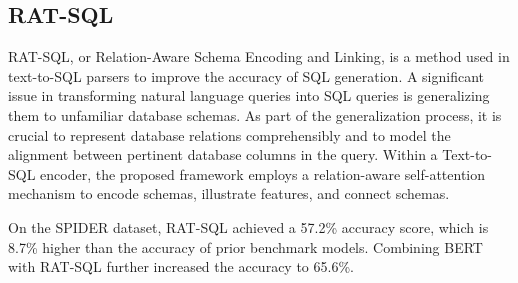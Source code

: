 \subsection{RAT-SQL} \label{sec:ratsql}

RAT-SQL, or Relation-Aware Schema Encoding and Linking\cite{wang_rat_sql_2021}, is a method used in text-to-SQL parsers to improve the accuracy of SQL generation. A significant issue in transforming natural language queries into SQL queries is generalizing them to unfamiliar database schemas. As part of the generalization process, it is crucial to represent database relations comprehensibly and to model the alignment between pertinent database columns in the query. Within a Text-to-SQL encoder, the proposed framework employs a relation-aware self-attention mechanism to encode schemas, illustrate features, and connect schemas.


On the SPIDER dataset, RAT-SQL achieved a 57.2\% accuracy score, which is 8.7\% higher than the accuracy of prior benchmark models. Combining BERT with RAT-SQL further increased the accuracy to 65.6\%.


